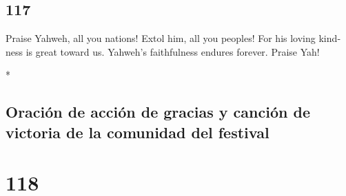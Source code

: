 \begin{paracol}{2}
\switchcolumn
\begin{otherlanguage}{english}

\hypertarget{section-233}{%
\section{117}\label{section-233}}

 Praise Yahweh, all you nations! Extol him, all you
peoples!  For his loving kindness is great toward us.
Yahweh's faithfulness endures forever. Praise Yah!

\end{otherlanguage}

\switchcolumn[0]*

\hypertarget{oraciuxf3n-de-acciuxf3n-de-gracias-y-canciuxf3n-de-victoria-de-la-comunidad-del-festival}{%
\subsection{Oración de acción de gracias y canción de victoria de la
comunidad del
festival}\label{oraciuxf3n-de-acciuxf3n-de-gracias-y-canciuxf3n-de-victoria-de-la-comunidad-del-festival}}

\hypertarget{section-234}{%
\section{118}\label{section-234}}


\end{paracol}
